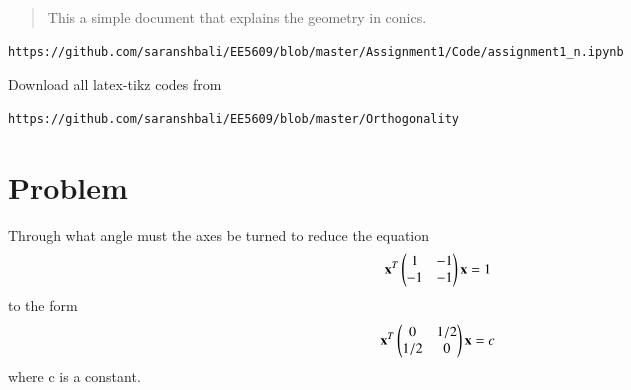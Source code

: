 \documentclass[journal,12pt,twocolumn]{IEEEtran}
\begin{document}
%
\begin{abstract}
This a simple document that explains the geometry in conics.
\end{abstract}
%
\begin{lstlisting}
https://github.com/saranshbali/EE5609/blob/master/Assignment1/Code/assignment1_n.ipynb
\end{lstlisting}
%
Download all latex-tikz codes from 
% 
\begin{lstlisting}
https://github.com/saranshbali/EE5609/blob/master/Orthogonality
\end{lstlisting}
%
\section{Problem}
Through what angle must the axes be turned to reduce the equation
\begin{align}
	\mathbf{x}^T\begin{pmatrix} 1 & -1 \\ -1 & -1\end{pmatrix}\mathbf{x} = 1 \label{1}
\end{align}
to the form
\begin{align}
	\mathbf{x}^T\begin{pmatrix} 0 & 1/2 \\ 1/2 & 0\end{pmatrix}\mathbf{x} = c \label{3}
\end{align}
where c is a constant.
\end{document}
